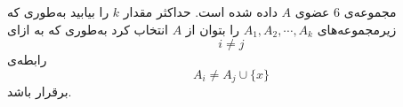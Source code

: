     \p 
مجموعه‌ی
$6$
عضوی
$A$
داده شده است. حداکثر مقدار
$k$
را بیابید به‌طوری که زیرمجموعه‌های
$A_1, A_2, \cdots, A_k$
را بتوان از
$A$
انتخاب کرد به‌طوری که به ازای
$$i \neq j$$
رابطه‌ی
$$A_i \neq A_j \cup \{x\}$$
برقرار باشد.